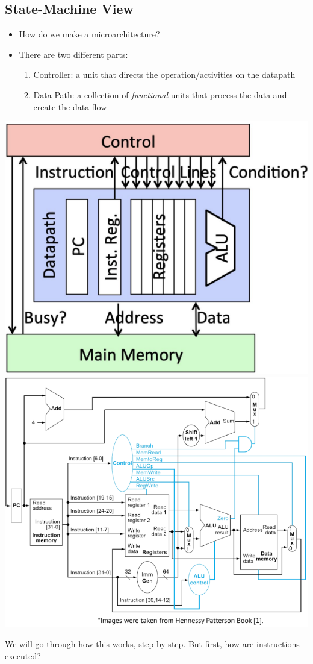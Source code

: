 \documentclass[10pt]{article}
\begin{document}
\subsection*{State-Machine View}
\begin{itemize}
    \item How do we make a microarchitecture?  
    \item There are two different parts:
    \begin{enumerate}
        \item Controller: a unit that directs the operation/activities on the datapath
        \item Data Path: a collection of \textit{functional} units that process the data and create the data-flow
    \end{enumerate}
\end{itemize}
\begin{center}
    \includegraphics*[scale=0.8]{W2_1.png}
    \includegraphics*[scale=0.8]{W2_2.png}
\end{center}
We will go through how this works, step by step.  But first, how are instructions executed?
\end{document}
